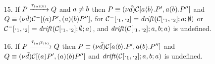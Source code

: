 \begin{lemma}{\label{lemm:inv_on_lts}}
\begin{itemize}
\begin{itemize}
	\end{itemize}
\item[15.] If $P\xrightarrow{\tau_{(a) (b)}}Q$ and $a\neq b$ then 
         $P\equiv (\nu \tilde {d})\mathcal{C}[a\langle b\rangle.P', a(b).P'']$ and\\
         $Q\equiv (\nu \tilde {d})\mathcal{C}^-[ (a)P', (a)(b)P''],$ for 
	      $\mathcal{C}^-[\cdot_1,\cdot_2]=\mathit {drift}(\mathcal{C}[\cdot_1, \cdot_2 ];a; \emptyset)$ or $\mathcal{C}^-[\cdot_1,\cdot_2]=\mathit {drift}(\mathcal{C}[\cdot_1, \cdot_2 ]; \emptyset; a)$, and $\mathit {drift}(\mathcal{C}[\cdot_1, \cdot_2 ];  a,b; a)$ is undefined.
\item[16.] If $P\xrightarrow{\tau_{(a)^2 (b)}}Q$ then 
          $P\equiv (\nu \tilde {d})\mathcal{C}[a\langle b\rangle.P', a(b).P'']$ and\\ $Q\equiv (\nu \tilde {d})\mathcal{C}[ (a)P', (a)(b)P'']$ 
	   and $\mathit {drift}(\mathcal{C}[\cdot_1, \cdot_2 ]; a, b;a)$ is undefined.
	\end{itemize}
\end{lemma}
